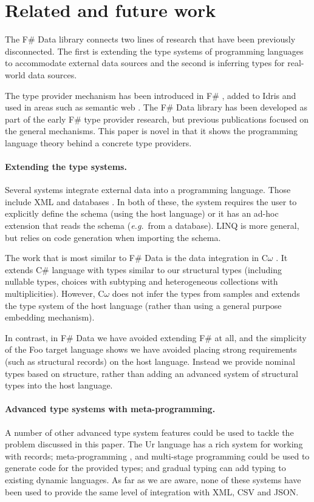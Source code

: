 \documentclass[10pt]{sigplanconf}
\begin{document}
\section{Related and future work}
\label{sec:related}

The F\# Data library connects two lines of research that have been previously disconnected. The first is 
extending the type systems of programming languages to accommodate external data sources and the second
is inferring types for real-world data sources.

The type provider mechanism has been introduced in F\# \cite{fsharp-typeprov,fsharp-typeprov-ddfp}, 
added to Idris  \cite{idris-tp} and used in areas such as semantic web \cite{liteq}. The F\# Data 
library has been developed as part of the early F\# type provider research, but previous 
publications focused on the general mechanisms. This paper is novel in that it shows the 
programming language theory behind a concrete type providers. 

\paragraph{Extending the type systems.} 
Several systems integrate external data into a programming language. Those include 
XML \cite{xduce,xduce-ml} and databases \cite{links}. In both of these, the system requires
the user to explicitly define the schema (using the host language) or it has an ad-hoc extension 
that reads the schema (\emph{e.g.}~from a database). LINQ \cite{linq} is more general, but relies
on code generation when importing the schema.

The work that is most similar to F\# Data is the data integration in C$\omega$ \cite{comega-xs}.
It extends C\# language with types similar to our structural types 
(including nullable types, choices with subtyping and heterogeneous collections with multiplicities).
However, C$\omega$ does not infer the types from samples and extends the type system of the host
language (rather than using a general purpose embedding mechanism).

In contrast, in F\# Data 
we have avoided extending F\# at all, and the simplicity of the Foo 
target language shows we have avoided placing strong requirements 
(such as structural records) on the host language. Instead we provide nominal 
types based on structure, rather than adding an advanced
system of structural types into the host language.

\paragraph{Advanced type systems with meta-programming.}
A number of other advanced type system features could be used to tackle the problem discussed 
in this paper. The Ur \cite{ur} language has a rich system for working with records; 
meta-programming \cite{template-hask}, \cite{th-camlp4} and multi-stage programming \cite{multi-stage}
could be used to generate code for the provided types; and gradual typing \cite{gradual,gradual-js} 
can add typing to existing dynamic languages. As far as we are aware, none of these 
systems have been used to provide the same level of integration with XML, CSV and JSON.
\end{document}
